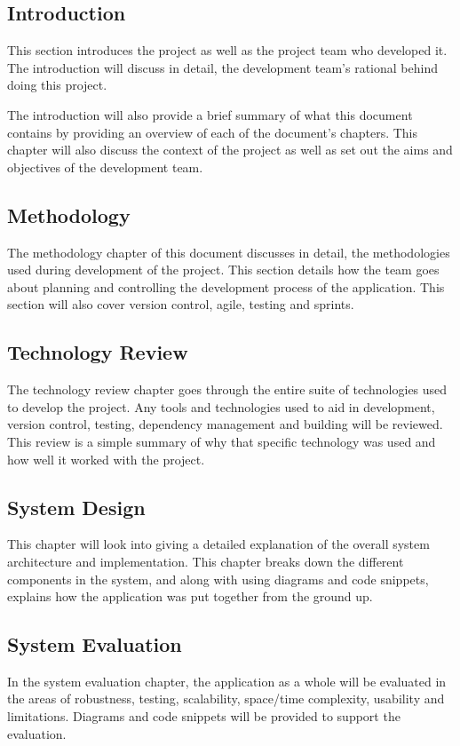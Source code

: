 \subsection{Introduction}
\label{sec:IntroductionIntroduction}
This section introduces the project as well as the project team who developed it. The introduction will discuss in detail, the development team's rational behind doing this project.

\bigskip

The introduction will also provide a brief summary of what this document contains by providing an overview of each of the document's chapters.
This chapter will also discuss the context of the project as well as set out the aims and objectives of the development team.

\subsection{Methodology}
\label{sec:IntroductionMethodology}
The methodology chapter of this document discusses in detail, the methodologies used during development of the project. This section details how the team goes about planning and controlling the development process of the application. This section will also cover version control, agile, testing and sprints.

\subsection{Technology Review}
\label{sec:IntroductionReview}
The technology review chapter goes through the entire suite of technologies used to develop the project. Any tools and technologies used to aid in development, version control, testing, dependency management and building will be reviewed. This review is a simple summary of why that specific technology was used and how well it worked with the project.

\subsection{System Design}
\label{sec:IntroductionDesign}
This chapter will look into giving a detailed explanation of the overall system architecture and implementation. This chapter breaks down the different components in the system, and along with using diagrams and code snippets, explains how the application was put together from the ground up. 

\subsection{System Evaluation}
In the system evaluation chapter, the application as a whole will be evaluated in the areas of robustness, testing, scalability, space/time complexity, usability and limitations. Diagrams and code snippets will be provided to support the evaluation. 

